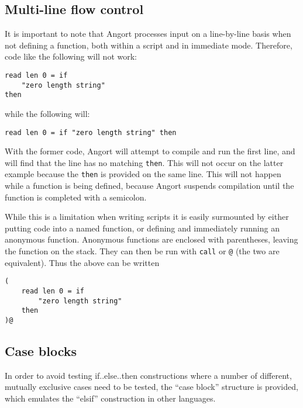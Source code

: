 \subsection{Multi-line flow control}
\label{multilineflow}
It is important to note that Angort processes input on a line-by-line
basis when not defining a function, both within a script and in immediate
mode. Therefore, code like the following will not work:
\begin{lstlisting}
read len 0 = if
    "zero length string"
then
\end{lstlisting}
while the following will:
\begin{lstlisting}
read len 0 = if "zero length string" then
\end{lstlisting}
With the former code, Angort will attempt to compile and run the first line,
and will find that the line has no matching \texttt{then}. This will not
occur on the latter example because the \texttt{then} is provided on
the same line. This will not happen while a function is being defined,
because Angort suspends compilation until the function is completed
with a semicolon.

While this is a limitation when writing scripts it is easily surmounted
by either putting code into a named function, or defining and immediately
running an anonymous function. Anonymous functions are enclosed with 
parentheses, leaving the function on the stack. They can then be run
with \texttt{call} or \texttt{@} (the two are equivalent). Thus
the above can be written
\begin{lstlisting}
(
    read len 0 = if
        "zero length string"
    then
)@
\end{lstlisting}





\subsection{Case blocks}
In order to avoid testing if..else..then constructions where a number of
different, mutually exclusive cases need to be tested, the ``case block''
structure is provided, which emulates the ``elsif'' construction in other
languages.

